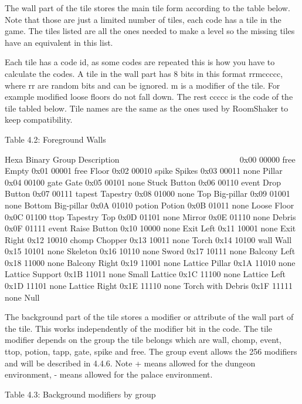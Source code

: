  The wall part of the tile stores the main tile form according to the table
 below. Note that those are just a limited number of tiles, each code has a
 tile in the game. The tiles listed are all the ones needed to make a level
 so the missing tiles have an equivalent in this list.

 Each tile has a code id, as some codes are repeated this is how you have
 to calculate the codes. A tile in the wall part has 8 bits in this format
 rrmccccc, where rr are random bits and can be ignored. m is a modifier of
 the tile. For example modified loose floors do not fall down. The rest
 ccccc is the code of the tile tabled below. Tile names are the same as the
 ones used by RoomShaker to keep compatibility.

                   Table 4.2: Foreground Walls
                   ~~~~~~~~~~~~~~~~~~~~~~~~~~~

  Hexa Binary Group  Description
  ~~~~ ~~~~~~ ~~~~~  ~~~~~~~~~~~
  0x00 00000  free   Empty
  0x01 00001  free   Floor
  0x02 00010  spike  Spikes
  0x03 00011  none   Pillar
  0x04 00100  gate   Gate
  0x05 00101  none   Stuck Button
  0x06 00110  event  Drop Button
  0x07 00111  tapest Tapestry
  0x08 01000  none   Top Big-pillar
  0x09 01001  none   Bottom Big-pillar
  0x0A 01010  potion Potion
  0x0B 01011  none   Loose Floor
  0x0C 01100  ttop   Tapestry Top
  0x0D 01101  none   Mirror
  0x0E 01110  none   Debris
  0x0F 01111  event  Raise Button
  0x10 10000  none   Exit Left
  0x11 10001  none   Exit Right
  0x12 10010  chomp  Chopper
  0x13 10011  none   Torch
  0x14 10100  wall   Wall
  0x15 10101  none   Skeleton
  0x16 10110  none   Sword
  0x17 10111  none   Balcony Left
  0x18 11000  none   Balcony Right
  0x19 11001  none   Lattice Pillar
  0x1A 11010  none   Lattice Support
  0x1B 11011  none   Small Lattice
  0x1C 11100  none   Lattice Left
  0x1D 11101  none   Lattice Right
  0x1E 11110  none   Torch with Debris
  0x1F 11111  none   Null

 The background part of the tile stores a modifier or attribute of the
 wall part of the tile. This works independently of the modifier bit in the
 code. The tile  modifier depends on the group the tile belongs which are
 wall, chomp, event, ttop, potion, tapp, gate, spike and free.
 The group event allows the 256 modifiers and will be described in 4.4.6.
 Note + means allowed for the dungeon environment, - means allowed for the
 palace environment.

                   Table 4.3: Background modifiers by group
                   ~~~~~~~~~~~~~~~~~~~~~~~~~~~~~~~~~~~~~~~~

